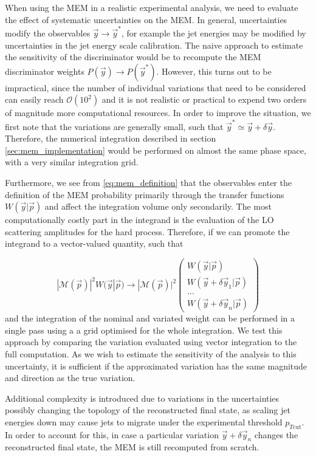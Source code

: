 When using the MEM in a realistic experimental analysis, we need to evaluate the effect of systematic uncertainties on the MEM. In general, uncertainties modify the observables $\vec{y} \rightarrow \vec{y}^*$, for example the jet energies may be modified by uncertainties in the jet energy scale calibration. The naive approach to estimate the sensitivity of the discriminator would be to recompute the MEM discriminator weights $P(\vec{y}) \rightarrow P(\vec{y}^*)$. However, this turns out to be impractical, since the number of individual variations that need to be considered can easily reach $\mathcal{O}(10^2)$ and it is not realistic or practical to expend two orders of magnitude more computational resources.
In order to improve the situation, we first note that the variations are generally small, such that $\vec{y}^* \simeq \vec{y} + \delta \vec{y}$. Therefore, the numerical integration described in section \cref{sec:mem_implementation} would be performed on almost the same phase space, with a very similar integration grid.

Furthermore, we see from \cref{eq:mem_definition} that the observables enter the definition of the MEM probability primarily through the transfer functions $W(\vec{y} | \vec{p})$ and affect the integration volume only secondarily. The most computationally costly part in the integrand is the evaluation of the LO scattering amplitudes for the hard process. Therefore, if we can promote the integrand to a vector-valued quantity, such that

\begin{equation}
|\mathcal{M}(\vec{p})|^2 W(\vec{y} | \vec{p}) \rightarrow |\mathcal{M}(\vec{p})|^2  \begin{pmatrix}
  W(\vec{y} | \vec{p}) \\
  W(\vec{y} + \delta \vec{y}_1 | \vec{p}) \\
  \dots \\
  W(\vec{y} + \delta \vec{y}_n | \vec{p})
 \end{pmatrix}
\end{equation}
and the integration of the nominal and variated weight can be performed in a single pass using a a grid optimised for the whole integration. We test this approach by comparing the variation evaluated using vector integration to the full computation. As we wish to estimate the sensitivity of the analysis to this uncertainty, it is sufficient if the approximated variation has the same magnitude and direction as the true variation.

Additional complexity is introduced due to variations in the uncertainties possibly changing the topology of the reconstructed final state, as scaling jet energies down may cause jets to migrate under the experimental threshold $p_{T\mathrm{cut}}$. In order to account for this, in case a particular variation $\vec{y} + \delta \vec{y}_n$ changes the reconstructed final state, the MEM is still recomputed from scratch.

